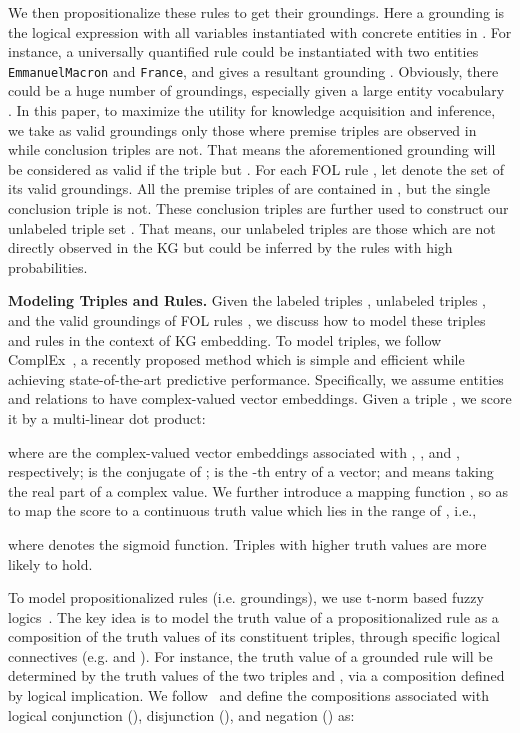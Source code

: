 \documentclass[letterpaper]{article} \usepackage{aaai18}  \usepackage{times}  \usepackage{helvet}  \usepackage{courier}  \usepackage{url}  \usepackage{graphicx}  \usepackage{amsmath}
\begin{document}
We then propositionalize these rules to get their groundings. Here a grounding is the logical expression with all variables instantiated with concrete entities in . For instance, a universally quantified rule   could be instantiated with two entities \texttt{\small EmmanuelMacron} and \texttt{\small France}, and gives a resultant grounding   . Obviously, there could be a huge number of groundings, especially given a large entity vocabulary . In this paper, to maximize the utility for knowledge acquisition and inference, we take as valid groundings only those where premise triples are observed in  while conclusion triples are not. That means the aforementioned grounding will be considered as valid if the triple  but . For each FOL rule , let  denote the set of its valid groundings. All the premise triples of  are contained in , but the single conclusion triple is not. These conclusion triples are further used to construct our unlabeled triple set . That means, our unlabeled triples are those which are not directly observed in the KG but could be inferred by the rules with high probabilities.

\smallskip
\noindent\textbf{Modeling Triples and Rules.} Given the labeled triples , unlabeled triples , and the valid groundings of FOL rules , we discuss how to model these triples and rules in the context of KG embedding. To model triples, we follow ComplEx~\cite{trouillon2016:ComplEx}, a recently proposed method which is simple and efficient while achieving state-of-the-art predictive performance. Specifically, we assume entities and relations to have complex-valued vector embeddings. Given a triple , we score it by a multi-linear dot product:

where   are the complex-valued vector embeddings associated with , , and , respectively;  is the conjugate of ;  is the -th entry of a vector; and  means taking the real part of a complex value. We further introduce a mapping function , so as to map the score  to a continuous truth value which lies in the range of , i.e.,

where  denotes the sigmoid function. Triples with higher truth values are more likely to hold.

To model propositionalized rules (i.e. groundings), we use t-norm based fuzzy logics~\cite{hajek1998:FuzzyLogic}. The key idea is to model the truth value of a propositionalized rule as a composition of the truth values of its constituent triples, through specific logical connectives (e.g.  and ). For instance, the truth value of a grounded rule  will be determined by the truth values of the two triples  and , via a composition defined by logical implication. We follow~\cite{guo2016:KALE} and define the compositions associated with logical conjunction (), disjunction (), and negation () as:
\end{document}
